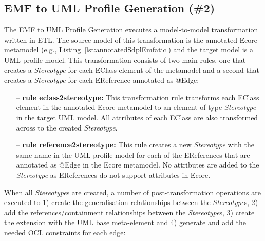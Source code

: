 \subsection{EMF to UML Profile Generation (\#2)}
\label{sec:profileGeneration}
The EMF to UML Profile Generation executes a model-to-model transformation written in ETL. 
The source model of this transformation is the annotated Ecore metamodel (e.g.,  Listing~\ref{lst:annotatedSdplEmfatic}) and the target model is a UML profile model.
This transformation consists of two main rules, one that creates a \textit{Stereotype} for each EClass element of the metamodel and a second that creates a \textit{Stereotype} for each EReference annotated as @Edge:

\begin{itemize}
	\item[--] \textbf{rule eclass2stereotype:} This transformation rule transforms each EClass element in the annotated Ecore metamodel to an element of type \textit{Stereotype} in the target UML model. 
	All attributes of each EClass are also transformed across to the created \textit{Stereotype}. 
	\item[--] \textbf{rule reference2stereotype:} This rule creates a new \textit{Stereotype} with the same name in the UML profile model for each of the EReferences that are annotated as @Edge in the Ecore metamodel. 
	No attributes are added to the \textit{Stereotype} as EReferences do not support attributes in Ecore.
\end{itemize}

When all \textit{Stereotype}s are created, a number of post-transformation operations are executed to 1) create the generalisation relationships between the \textit{Stereotype}s, 2) add the references/containment relationships between the \textit{Stereotype}s, 3) create the extension with the UML base meta-element and 4) generate and add the needed OCL constraints for each edge: 


